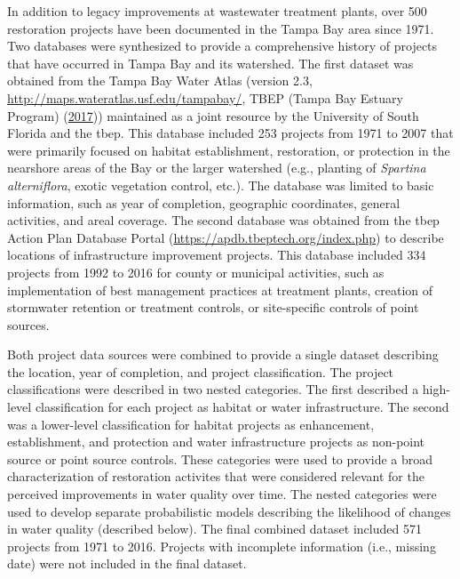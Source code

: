 \documentclass[]{article}
\begin{document}
In addition to legacy improvements at wastewater treatment plants, over
500 restoration projects have been documented in the Tampa Bay area
since 1971. Two databases were synthesized to provide a comprehensive
history of projects that have occurred in Tampa Bay and its watershed.
The first dataset was obtained from the Tampa Bay Water Atlas (version
2.3, \url{http://maps.wateratlas.usf.edu/tampabay/}, TBEP (Tampa Bay
Estuary Program) (\protect\hyperlink{ref-TBEP17}{2017})) maintained as a
joint resource by the University of South Florida and the \ac{tbep}.
This database included 253 projects from 1971 to 2007 that were
primarily focused on habitat establishment, restoration, or protection
in the nearshore areas of the Bay or the larger watershed (e.g.,
planting of \emph{Spartina alterniflora}, exotic vegetation control,
etc.). The database was limited to basic information, such as year of
completion, geographic coordinates, general activities, and areal
coverage. The second database was obtained from the \ac{tbep} Action
Plan Database Portal (\url{https://apdb.tbeptech.org/index.php}) to
describe locations of infrastructure improvement projects. This database
included 334 projects from 1992 to 2016 for county or municipal
activities, such as implementation of best management practices at
treatment plants, creation of stormwater retention or treatment
controls, or site-specific controls of point sources.

Both project data sources were combined to provide a single dataset
describing the location, year of completion, and project classification.
The project classifications were described in two nested categories. The
first described a high-level classification for each project as habitat
or water infrastructure. The second was a lower-level classification for
habitat projects as enhancement, establishment, and protection and water
infrastructure projects as non-point source or point source controls.
These categories were used to provide a broad characterization of
restoration activites that were considered relevant for the perceived
improvements in water quality over time. The nested categories were used
to develop separate probabilistic models describing the likelihood of
changes in water quality (described below). The final combined dataset
included 571 projects from 1971 to 2016. Projects with incomplete
information (i.e., missing date) were not included in the final dataset.
\end{document}
